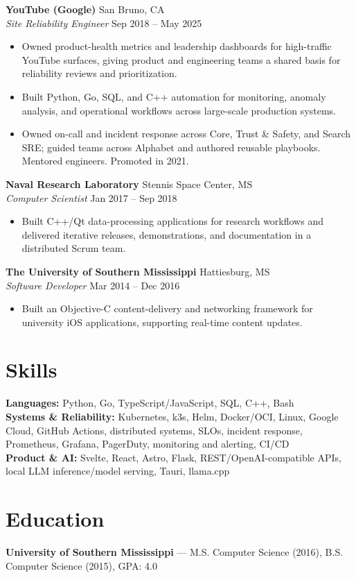 \documentclass[11pt]{article}
\begin{document}
\textbf{YouTube (Google)} \hfill San Bruno, CA\\
\textit{Site Reliability Engineer} \hfill Sep 2018 -- May 2025
\begin{itemize}
  \item Owned product-health metrics and leadership dashboards for high-traffic YouTube surfaces,
  giving product and engineering teams a shared basis for reliability reviews and prioritization.
  \item Built Python, Go, SQL, and C++ automation for monitoring, anomaly analysis, and operational
  workflows across large-scale production systems.
  \item Owned on-call and incident response across Core, Trust \& Safety, and Search SRE; guided
  teams across Alphabet and authored reusable playbooks. Mentored engineers. Promoted in 2021.
\end{itemize}

\textbf{Naval Research Laboratory} \hfill Stennis Space Center, MS\\
\textit{Computer Scientist} \hfill Jan 2017 -- Sep 2018
\begin{itemize}
  \item Built C++/Qt data-processing applications for research workflows and delivered iterative
  releases, demonstrations, and documentation in a distributed Scrum team.
\end{itemize}

\textbf{The University of Southern Mississippi} \hfill Hattiesburg, MS\\
\textit{Software Developer} \hfill Mar 2014 -- Dec 2016
\begin{itemize}
  \item Built an Objective-C content-delivery and networking framework for university iOS
  applications, supporting real-time content updates.
\end{itemize}

\section*{Skills}
\textbf{Languages:} Python, Go, TypeScript/JavaScript, SQL, C++, Bash\\
\textbf{Systems \& Reliability:} Kubernetes, k3s, Helm, Docker/OCI, Linux, Google Cloud, GitHub
Actions, distributed systems, SLOs, incident response, Prometheus, Grafana, PagerDuty, monitoring
and alerting, CI/CD\\
\textbf{Product \& AI:} Svelte, React, Astro, Flask, REST/OpenAI-compatible APIs, local LLM
inference/model serving, Tauri, llama.cpp

\section*{Education}
\textbf{University of Southern Mississippi} --- M.S. Computer Science (2016), B.S. Computer
Science (2015), GPA: 4.0
\end{document}
